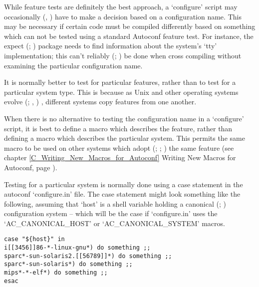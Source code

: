 While feature tests are definitely the best approach, a `configure' script may 
occasionally ({\MdQ{}}, {\McQ{}}) have to make a decision based on a configuration 
name. This may be necessary if certain code must be compiled differently 
based on something which can not be tested using a standard Autoconf feature 
test. For instance, the expect ({\McQ{}}; {\McQ{}}) package needs to find 
information about the system's `tty' implementation; this can't 
reliably ({\MaQ{}}; {\MbQ{}}) be done when cross compiling without examining 
the particular configuration name.

It is normally better to test for particular features, rather than to test for 
a particular system type. This is because as Unix and other operating 
systems evolve ({\MaQ{}}; {\MbQ{}}, {\MbQ{}}) , different systems copy features 
from one another.

When there is no alternative to testing the configuration name in 
a `configure' script, it is best to define a macro which describes the feature,
rather than defining a macro which describes the particular system. This 
permits the same macro to be used on other systems which 
adopt ({\MbQ{}}; {\MbQ{}}; {\MdQ{}}) the 
same feature (see chapter \ref{C_Writing_New_Macros_for_Autoconf}
Writing New Macros for Autoconf,
page \pageref{C_Writing_New_Macros_for_Autoconf}).

Testing
for a particular system is normally done using a case statement in 
the autoconf `configure.in' file. The case statement might look something 
like the following, assuming that `host' is a shell variable holding a 
canonical ({\MbQ{}}; {\MbQ{}}) configuration system -- which will be the case 
if `configure.in' uses the `AC\_{}CANONICAL\_{}HOST' 
or `AC\_{}CANONICAL\_{}SYSTEM' macros.

 	
\begin{verbatim}
case "${host}" in
i[[3456]]86-*-linux-gnu*) do something ;;
sparc*-sun-solaris2.[[56789]]*) do something ;;
sparc*-sun-solaris*) do something ;;
mips*-*-elf*) do something ;;
esac
\end{verbatim}

